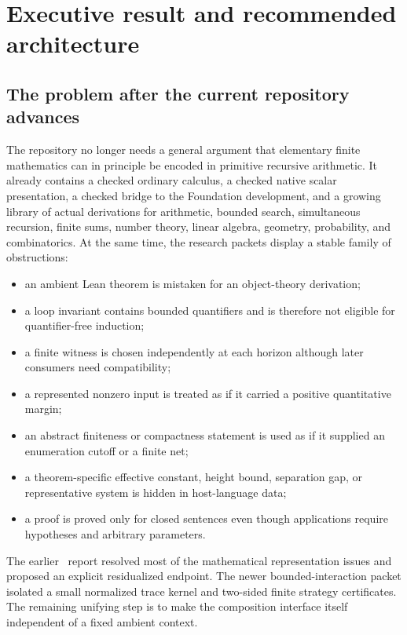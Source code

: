 \section{Executive result and recommended architecture}\label{sec:executive}

\subsection{The problem after the current repository advances}

The repository no longer needs a general argument that elementary finite mathematics can in principle be encoded in primitive recursive arithmetic.  It already contains a checked ordinary calculus, a checked native scalar presentation, a checked bridge to the Foundation development, and a growing library of actual derivations for arithmetic, bounded search, simultaneous recursion, finite sums, number theory, linear algebra, geometry, probability, and combinatorics.  At the same time, the research packets display a stable family of obstructions:
\begin{itemize}
  \item an ambient Lean theorem is mistaken for an object-theory derivation;
  \item a loop invariant contains bounded quantifiers and is therefore not eligible for quantifier-free induction;
  \item a finite witness is chosen independently at each horizon although later consumers need compatibility;
  \item a represented nonzero input is treated as if it carried a positive quantitative margin;
  \item an abstract finiteness or compactness statement is used as if it supplied an enumeration cutoff or a finite net;
  \item a theorem-specific effective constant, height bound, separation gap, or representative system is hidden in host-language data;
  \item a proof is proved only for closed sentences even though applications require hypotheses and arbitrary parameters.
\end{itemize}
The earlier \KIFCR\ report resolved most of the mathematical representation issues and proposed an explicit residualized endpoint.  The newer bounded-interaction packet isolated a small normalized trace kernel and two-sided finite strategy certificates.  The remaining unifying step is to make the composition interface itself independent of a fixed ambient context.

